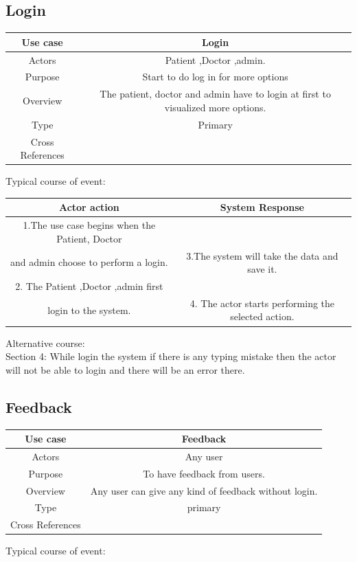 \documentclass[14pt,a4paper,calibribody]{article}
\begin{document}
\subsection{Login}
\begin{center}
\begin{tabular}{ |c| c| }
\hline
Use case & Login  \\ 
\hline
Actors & Patient ,Doctor ,admin. \\  
\hline
Purpose & Start to do log in for more options\\ 
\hline
Overview & The patient, doctor and admin have to login at first to visualized more options. \\ 
\hline
 Type & Primary  \\ 
\hline
Cross References &  \\ 
\hline
\end{tabular}
\end{center}
Typical course of event:

\begin{center}
\begin{tabular}{ |c| c| }
\hline
Actor action & System Response \\ 
\hline
 1.The use case begins when the Patient, Doctor \\ and admin choose to perform a login.

& 3.The system will take the data and save it.

\\  
\hline
2. The Patient ,Doctor ,admin first \\ login to the system. & 4. The actor starts performing the selected action.\\   
\hline
\end{tabular}
\end{center}
Alternative course:\\
Section 4: While login the system if there is any typing mistake then the actor will not be able to login and there will be an error there.


\subsection{Feedback}
\begin{center}
\begin{tabular}{ |c| c| }
\hline
Use case & Feedback \\ 
\hline
Actors & Any user \\  
\hline
Purpose & To have feedback from users. \\ 
\hline
Overview & Any user can give any kind of feedback without login.\\ 
\hline
Type & primary  \\ 
\hline
Cross References & \\ 
\hline
\end{tabular}
\end{center}
Typical course of event:
\end{document}
